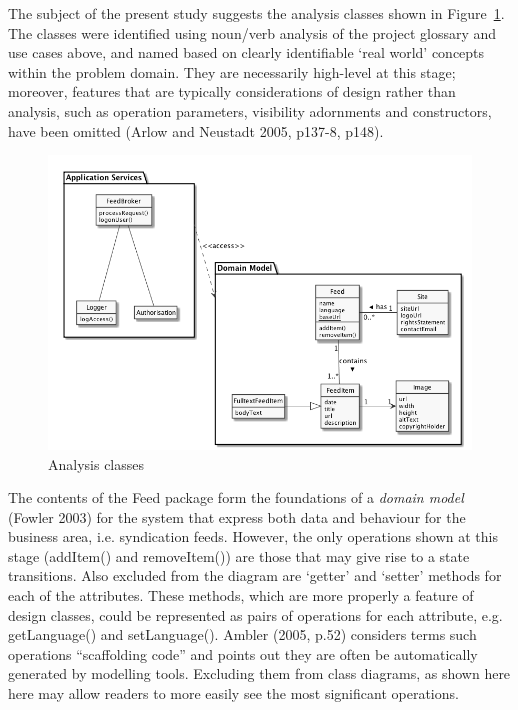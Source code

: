 \documentclass[a4paper]{article}
\begin{document}
The subject of the present study suggests the analysis classes shown in Figure~\ref{analysis-classes}. The classes were identified using noun/verb analysis of the project glossary and use cases above, and named based on clearly identifiable `real world' concepts within the problem domain. They are necessarily high-level at this stage; moreover, features that are typically considerations of design rather than analysis, such as operation parameters, visibility adornments and constructors, have been omitted (Arlow and Neustadt 2005, p137-8, p148).

\begin{figure}
  \begin{center}
    \includegraphics[width=\textwidth]{analysis-classes.png}
  \end{center}
  \label{analysis-classes}
  \caption{Analysis classes}
\end{figure}

The contents of the \textsf{Feed} package form the foundations of a \textit{domain model} (Fowler 2003) for the system that express both data and behaviour for the business area, i.e. syndication feeds. However, the only operations shown at this stage (\textsf{addItem()} and \textsf{removeItem()}) are those that may give rise to a state transitions. Also excluded from the diagram are `getter' and `setter' methods for each of the attributes. These methods, which are more properly a feature of design classes, could be represented as pairs of operations for each attribute, e.g. \textsf{getLanguage()} and \textsf{setLanguage()}. Ambler (2005, p.52) considers terms such operations ``scaffolding code'' and points out they are often be automatically generated by modelling tools. Excluding them from class diagrams, as shown here here may allow readers to more easily see the most significant operations.
\end{document}
